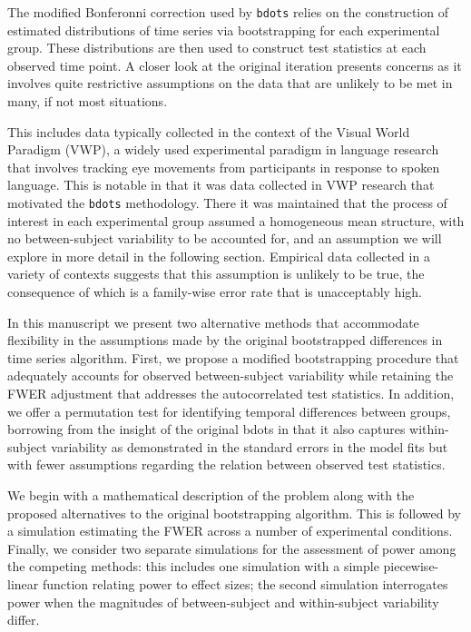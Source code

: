 \documentclass{article}
\newcommand{\xt}{\texttt}
\begin{document}
The modified Bonferonni correction used by \xt{bdots} relies on the construction of estimated distributions of time series via bootstrapping for each experimental group. These distributions are then used to construct test statistics at each observed time point. A closer look at the original iteration presents concerns as it involves quite restrictive assumptions on the data that are unlikely to be met in many, if not most situations. 

This includes data typically collected in the context of the Visual World Paradigm (VWP), a widely used experimental paradigm in language research that involves tracking eye movements from participants in response to spoken language. This is notable in that it was data collected in VWP research that motivated the \xt{bdots} methodology. There it was maintained that the process of interest in each experimental group assumed a homogeneous mean structure, with no between-subject variability to be accounted for, and an assumption we will explore in more detail in the following section. Empirical data collected in a variety of contexts suggests that this assumption is unlikely to be true, the consequence of which is a family-wise error rate that is unacceptably high. 



In this manuscript we present two alternative methods that accommodate flexibility in the assumptions made by the original bootstrapped differences in time series algorithm. First, we propose a modified bootstrapping procedure that adequately accounts for observed between-subject variability while retaining the FWER adjustment that addresses the autocorrelated test statistics. In addition, we offer a permutation test for identifying temporal differences between groups, borrowing from the insight of the original bdots in that it also captures within-subject variability as demonstrated in the standard errors in the model fits but with fewer assumptions regarding the relation between observed test statistics.

We begin with a mathematical description of the problem along with the proposed alternatives to the original bootstrapping algorithm. This is followed by a simulation estimating the FWER across a number of experimental conditions. Finally, we consider two separate simulations for the assessment of power among the competing methods: this includes one simulation with a simple piecewise-linear function relating power to effect sizes; the second simulation interrogates power when the magnitudes of between-subject and within-subject variability differ. 
\end{document}

